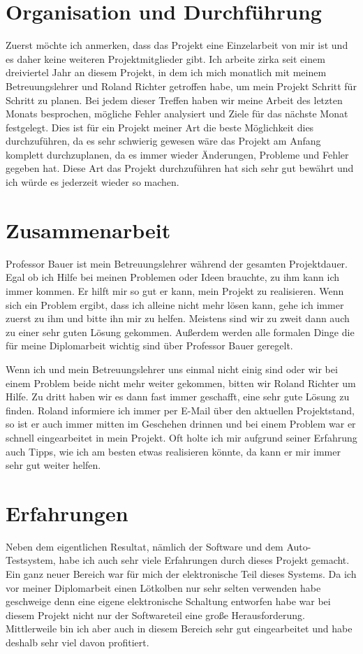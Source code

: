 \section{Organisation und Durchführung}
Zuerst möchte ich anmerken, dass das Projekt eine Einzelarbeit von mir ist und es daher keine weiteren Projektmitglieder gibt.
Ich arbeite zirka seit einem dreiviertel Jahr an diesem Projekt, in dem ich mich monatlich mit meinem Betreuungslehrer und Roland Richter getroffen habe, um mein Projekt Schritt für Schritt zu planen.
Bei jedem dieser Treffen haben wir meine Arbeit des letzten Monats besprochen, mögliche Fehler analysiert und Ziele für das nächste Monat festgelegt.
Dies ist für ein Projekt meiner Art die beste Möglichkeit dies durchzuführen, da es sehr schwierig gewesen wäre das Projekt am Anfang komplett durchzuplanen, da es immer wieder Änderungen, Probleme und Fehler gegeben hat.
Diese Art das Projekt durchzuführen hat sich sehr gut bewährt und ich würde es jederzeit wieder so machen.


\section{Zusammenarbeit}
Professor Bauer ist mein Betreuungslehrer während der gesamten Projektdauer.
Egal ob ich Hilfe bei meinen Problemen oder Ideen brauchte, zu ihm kann ich immer kommen.
Er hilft mir so gut er kann, mein Projekt zu realisieren.
Wenn sich ein Problem ergibt, dass ich alleine nicht mehr lösen kann, gehe ich immer zuerst zu ihm und bitte ihn mir zu helfen.
Meistens sind wir zu zweit dann auch zu einer sehr guten Lösung gekommen.
Außerdem werden alle formalen Dinge die für meine Diplomarbeit wichtig sind über Professor Bauer geregelt.

Wenn ich und mein Betreuungslehrer uns einmal nicht einig sind oder wir bei einem Problem beide nicht mehr weiter gekommen, bitten wir Roland Richter um Hilfe.
Zu dritt haben wir es dann fast immer geschafft, eine sehr gute Lösung zu finden. 
Roland informiere ich immer per E-Mail über den aktuellen Projektstand, so ist er auch immer mitten im Geschehen drinnen und bei einem Problem war er schnell eingearbeitet in mein Projekt.
Oft holte ich mir aufgrund seiner Erfahrung auch Tipps, wie ich am besten etwas realisieren könnte, da kann er mir immer sehr gut weiter helfen.


\section{Erfahrungen}
Neben dem eigentlichen Resultat, nämlich der Software und dem Auto-Testsystem, habe ich auch sehr viele Erfahrungen durch dieses Projekt gemacht.
Ein ganz neuer Bereich war für mich der elektronische Teil dieses Systems.
Da ich vor meiner Diplomarbeit einen Lötkolben nur sehr selten verwenden habe geschweige denn eine eigene elektronische Schaltung entworfen habe war bei diesem Projekt nicht nur der Softwareteil eine große Herausforderung.
Mittlerweile bin ich aber auch in diesem Bereich sehr gut eingearbeitet und habe deshalb sehr viel davon profitiert.


